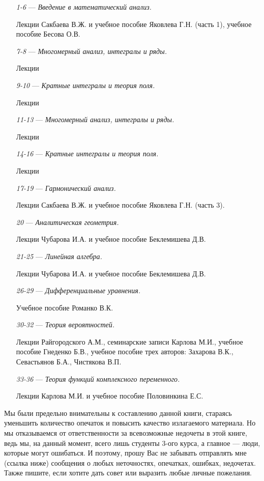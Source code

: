 \begin{itemize}
\item[\textit{1-6}]
\; --- \: \textit{Введение в математический анализ.} 

Лекции Сакбаева В.Ж. и учебное пособие Яковлева Г.Н. (часть 1), учебное пособие Бесова О.В.
\item[\textit{7-8}] 
\; --- \: \textit{Многомерный анализ, интегралы и ряды.}

Лекции
\item[\textit{9-10}] 
\; --- \: \textit{Кратные интегралы и теория поля.}

Лекции
\item[\textit{11-13}] 
\; --- \: \textit{Многомерный анализ, интегралы и ряды.}

Лекции
\item[\textit{14-16}] 
\; --- \: \textit{Кратные интегралы и теория поля.}

Лекции
\item[\textit{17-19}] 
\; --- \: \textit{Гармонический анализ.}

Лекции Сакбаева В.Ж. и учебное пособие Яковлева Г.Н. (часть 3).
\item[\textit{20}] 
\; --- \: \textit{Аналитическая геометрия.}

Лекции Чубарова И.А. и учебное пособие Беклемишева Д.В.
\item[\textit{21-25}] 
\; --- \: \textit{Линейная алгебра.}

Лекции Чубарова И.А. и учебное пособие Беклемишева Д.В.
\item[\textit{26-29}] 
\; --- \: \textit{Дифференциальные уравнения.}

Учебное пособие Романко В.К.

\item[\textit{30-32}]
\; --- \: \textit{Теория вероятностей.}

Лекции Райгородского А.М., семинарские записи Карлова М.И., учебное пособие Гнеденко Б.В., учебное пособие трех авторов: Захарова В.К., Севастьянов Б.А., Чистякова В.П.
\item[\textit{33-36}]
\; --- \: \textit{Теория функций комплексного переменного.}

Лекции Карлова М.И. и учебное пособие Половинкина Е.С.
\end{itemize}

Мы были предельно внимательны к составлению данной книги, стараясь уменьшить количество опечаток и повысить качество излагаемого материала. Но мы отказываемся от ответственности за всевозможные недочеты в этой книге, ведь мы, на данный момент, всего лишь студенты 3-ого курса, а главное --- люди, которые могут ошибаться. И поэтому, прошу Вас не забывать отправлять мне (ссылка ниже) сообщения о любых неточностях, опечатках, ошибках, недочетах. Также пишите, если хотите дать совет или выразить любые личные пожелания. 

